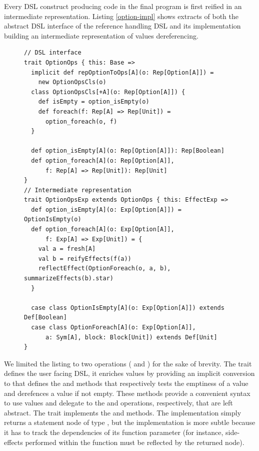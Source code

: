 \documentclass[american,english,runningheads]{llncs}
\begin{document}
Every DSL construct producing code in the final program is first reified in an intermediate representation. Listing
\ref{option-impl} shows extracts of both the abstract DSL interface of the  reference handling DSL and its
implementation building an intermediate representation of values dereferencing.

\begin{figure}
\begin{lstlisting}[caption=Null reference handling DSL,label=option-impl]
// DSL interface
trait OptionOps { this: Base =>
  implicit def repOptionToOps[A](o: Rep[Option[A]]) =
    new OptionOpsCls(o)
  class OptionOpsCls[+A](o: Rep[Option[A]]) {
    def isEmpty = option_isEmpty(o)
    def foreach(f: Rep[A] => Rep[Unit]) =
      option_foreach(o, f)
  }
  
  def option_isEmpty[A](o: Rep[Option[A]]): Rep[Boolean]
  def option_foreach[A](o: Rep[Option[A]],
      f: Rep[A] => Rep[Unit]): Rep[Unit]
}
// Intermediate representation
trait OptionOpsExp extends OptionOps { this: EffectExp =>
  def option_isEmpty[A](o: Exp[Option[A]]) = OptionIsEmpty(o)
  def option_foreach[A](o: Exp[Option[A]],
      f: Exp[A] => Exp[Unit]) = {
    val a = fresh[A]
    val b = reifyEffects(f(a))
    reflectEffect(OptionForeach(o, a, b), summarizeEffects(b).star)
  }
  
  case class OptionIsEmpty[A](o: Exp[Option[A]]) extends Def[Boolean]
  case class OptionForeach[A](o: Exp[Option[A]],
      a: Sym[A], block: Block[Unit]) extends Def[Unit]
}
\end{lstlisting}
\end{figure}

We limited the listing to two operations ( and ) for the sake of brevity. The
 trait defines the user facing DSL, it enriches  values by providing an implicit
conversion to  that defines the  and  methods that respectively tests
the emptiness of a value and derefences a value if not empty. These methods provide a convenient syntax to use
 values and delegate to the  and  operations,
respectively, that are left abstract. The  trait implements the  and
 methods. The  implementation simply returns a statement node of type
, but the  implementation is more subtle because it has to track the
dependencies of its function parameter  (for instance, side-effects performed within the  function
must be reflected by the returned  node).
\end{document}
